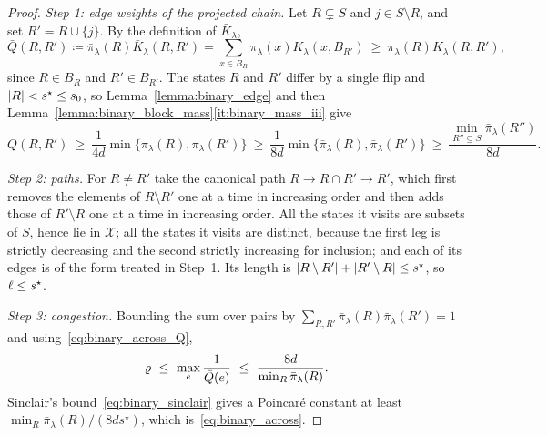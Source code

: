 \documentclass[aos]{imsart}%
\DeclarePairedDelimiter{\abs}{\lvert}{\rvert}
\newcommand{\ambientspace}[0]{\mathcal{X}}
\theoremstyle{plain}
\theoremstyle{definition}
\begin{document}
    \begin{proof}
        \emph{Step 1: edge weights of the projected chain.} Let $R\subsetneq S$
        and $j\in S\setminus R$, and set $R'=R\cup\{j\}$. By the definition of
        $\bar K_\lambda$,
        \begin{equation*}
            \bar Q(R,R')\coloneq\bar\pi_\lambda(R)\bar K_\lambda(R,R')
            =\sum_{x\in B_R}\pi_\lambda(x)K_\lambda(x,B_{R'})
            \ \geq\ \pi_\lambda(R)K_\lambda(R,R'),
        \end{equation*}
        since $R\in B_R$ and $R'\in B_{R'}$. The states $R$ and $R'$ differ by
        a single flip and $\abs R<s^{\star}\leq s_0$, so
        Lemma~\ref{lemma:binary_edge} and then
        Lemma~\ref{lemma:binary_block_mass}\ref{it:binary_mass_iii} give
        \begin{equation}
            \label{eq:binary_across_Q}
            \bar Q(R,R')\ \geq\ \frac{1}{4d}
            \min\{\pi_\lambda(R),\pi_\lambda(R')\}
            \ \geq\ \frac{1}{8d}
            \min\{\bar\pi_\lambda(R),\bar\pi_\lambda(R')\}
            \ \geq\ \frac{\min_{R''\subseteq S}\bar\pi_\lambda(R'')}{8d} .
        \end{equation}

        \emph{Step 2: paths.} For $R\neq R'$ take the canonical path
        $R\to R\cap R'\to R'$, which first removes the elements of
        $R\setminus R'$ one at a time in increasing order and then adds those
        of $R'\setminus R$ one at a time in increasing order. All the states it
        visits are subsets of $S$, hence lie in $\ambientspace$; all the states
        it visits are distinct, because the first leg is strictly decreasing
        and the second strictly increasing for inclusion; and each of its edges
        is of the form treated in Step~1. Its length is
        $\abs{R\setminus R'}+\abs{R'\setminus R}\leq s^{\star}$, so
        $\ell\leq s^{\star}$.

        \emph{Step 3: congestion.} Bounding the sum over pairs by
        $\sum_{R,R'}\bar\pi_\lambda(R)\bar\pi_\lambda(R')=1$
        and using~\eqref{eq:binary_across_Q},
        \begin{equation*}
            \varrho\ \leq\ \max_{e}\frac{1}{\bar Q(e)}
            \ \leq\ \frac{8d}{\min_{R}\bar\pi_\lambda(R)} .
        \end{equation*}
        Sinclair's bound~\eqref{eq:binary_sinclair} gives a Poincar\'e constant
        at least $\min_R\bar\pi_\lambda(R)/(8ds^{\star})$, which
        is~\eqref{eq:binary_across}.
    \end{proof}
\end{document}
